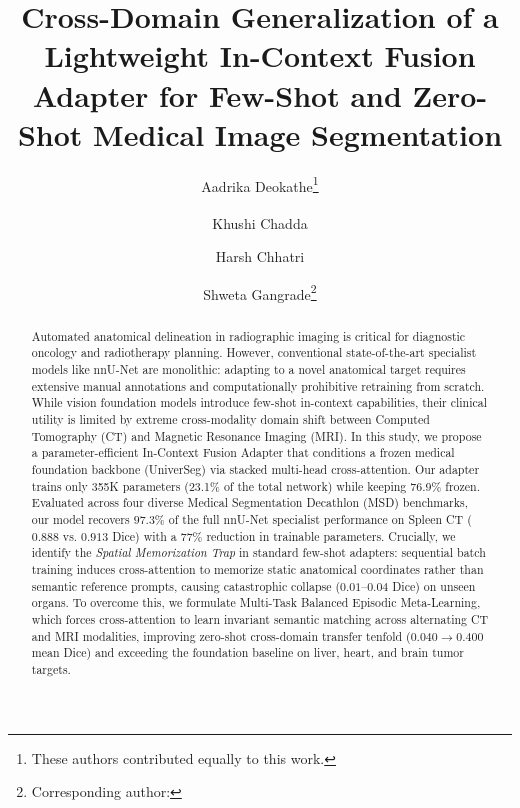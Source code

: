 \documentclass[runningheads]{llncs}
\begin{document}
\title{Cross-Domain Generalization of a Lightweight In-Context Fusion Adapter for Few-Shot and Zero-Shot Medical Image Segmentation}

\author{Aadrika Deokathe\thanks{These authors contributed equally to this work.} \and 
Khushi Chadda\textsuperscript{\thefootnote} \and 
Harsh Chhatri \and 
Shweta Gangrade\thanks{Corresponding author: }}
%


\maketitle

\begin{abstract}
Automated anatomical delineation in radiographic imaging is critical for diagnostic oncology and radiotherapy planning. However, conventional state-of-the-art specialist models like nnU-Net are monolithic: adapting to a novel anatomical target requires extensive manual annotations and computationally prohibitive retraining from scratch. While vision foundation models introduce few-shot in-context capabilities, their clinical utility is limited by extreme cross-modality domain shift between Computed Tomography (CT) and Magnetic Resonance Imaging (MRI). In this study, we propose a parameter-efficient In-Context Fusion Adapter that conditions a frozen medical foundation backbone (UniverSeg) via stacked multi-head cross-attention. Our adapter trains only 355K parameters (23.1\% of the total network) while keeping 76.9\% frozen. Evaluated across four diverse Medical Segmentation Decathlon (MSD) benchmarks, our model recovers $97.3\%$ of the full nnU-Net specialist performance on Spleen CT ($0.888$ vs. $0.913$ Dice) with a $77\%$ reduction in trainable parameters. Crucially, we identify the \textit{Spatial Memorization Trap} in standard few-shot adapters: sequential batch training induces cross-attention to memorize static anatomical coordinates rather than semantic reference prompts, causing catastrophic collapse ($0.01\text{--}0.04$ Dice) on unseen organs. To overcome this, we formulate Multi-Task Balanced Episodic Meta-Learning, which forces cross-attention to learn invariant semantic matching across alternating CT and MRI modalities, improving zero-shot cross-domain transfer tenfold ($0.040 \rightarrow 0.400$ mean Dice) and exceeding the foundation baseline on liver, heart, and brain tumor targets.

\end{abstract}
\end{document}
